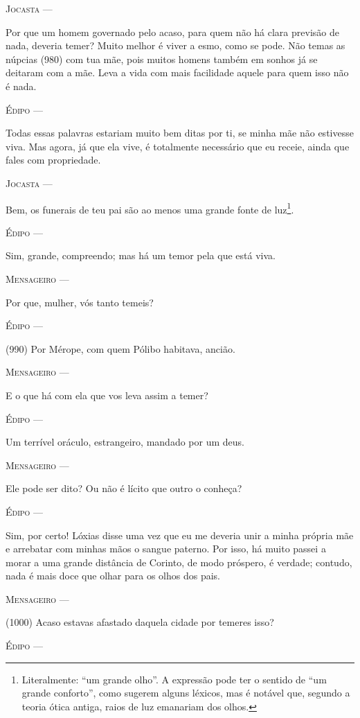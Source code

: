 \textsc{Jocasta} ---

Por que um homem governado pelo acaso, para quem não há clara previsão
de nada, deveria temer? Muito melhor é viver a esmo, como se pode. Não
temas as núpcias (980) com tua mãe, pois muitos homens também em sonhos
já se deitaram com a mãe. Leva a vida com mais facilidade aquele para
quem isso não é nada.

\textsc{Édipo} ---

Todas essas palavras estariam muito bem ditas por ti, se minha mãe não
estivesse viva. Mas agora, já que ela vive, é totalmente necessário que
eu receie, ainda que fales com propriedade.

\textsc{Jocasta} ---

Bem, os funerais de teu pai são ao menos uma grande fonte de
luz\footnote{Literalmente: ``um grande olho''. A expressão pode ter o
  sentido de ``um grande conforto'', como sugerem alguns léxicos, mas é
  notável que, segundo a teoria ótica antiga, raios de luz emanariam dos
  olhos.}.

\textsc{Édipo} ---

Sim, grande, compreendo; mas há um temor pela que está viva.

\textsc{Mensageiro} ---

Por que, mulher, vós tanto temeis?

\textsc{Édipo} ---

(990) Por Mérope, com quem Pólibo habitava, ancião.

\textsc{Mensageiro} ---

E o que há com ela que vos leva assim a temer?

\textsc{Édipo} ---

Um terrível oráculo, estrangeiro, mandado por um deus.

\textsc{Mensageiro} ---

Ele pode ser dito? Ou não é lícito que outro o conheça?

\textsc{Édipo} ---

Sim, por certo! Lóxias disse uma vez que eu me deveria unir a minha
própria mãe e arrebatar com minhas mãos o sangue paterno. Por isso, há
muito passei a morar a uma grande distância de Corinto, de modo
próspero, é verdade; contudo, nada é mais doce que olhar para os olhos
dos pais.

\textsc{Mensageiro} ---

(1000) Acaso estavas afastado daquela cidade por temeres isso?

\textsc{Édipo} ---

